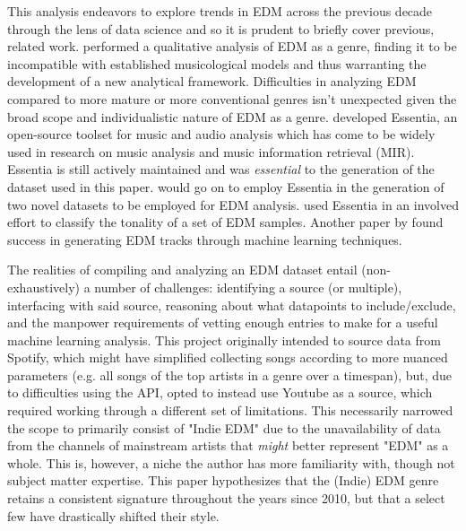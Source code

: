 \documentclass[article,pdftex,12pt,a4paper]{article}
\begin{document}
This analysis endeavors to explore trends in EDM across the previous decade through the lens of data science and so it is prudent to briefly cover previous, related work. \cite{van2016distinctiveness} performed a qualitative analysis of EDM as a genre, finding it to be incompatible with established musicological models and thus warranting the development of a new analytical framework. Difficulties in analyzing EDM compared to more mature or more conventional genres isn't unexpected given the broad scope and individualistic nature of EDM as a genre. \cite{bogdanov2013essentia} developed Essentia, an open-source toolset for music and audio analysis which has come to be widely used in research on music analysis and music information retrieval (MIR). Essentia is still actively maintained and was \textit{essential} to the generation of the dataset used in this paper. \cite{knees2015two} would go on to employ Essentia in the generation of two novel datasets to be employed for EDM analysis. \cite{faraldo2016key} used Essentia in an involved effort to classify the tonality of a set of EDM samples. Another paper by \cite{eigenfeldt2013evolving} found success in generating EDM tracks through machine learning techniques.

The realities of compiling and analyzing an EDM dataset entail (non-exhaustively) a number of challenges: identifying a source (or multiple), interfacing with said source, reasoning about what datapoints to include/exclude, and the manpower requirements of vetting enough entries to make for a useful machine learning analysis. This project originally intended to source data from Spotify, which might have simplified collecting songs according to more nuanced parameters (e.g. all songs of the top artists in a genre over a timespan), but, due to difficulties using the API, opted to instead use Youtube as a source, which required working through a different set of limitations. This necessarily narrowed the scope to primarily consist of "Indie EDM" due to the unavailability of data from the channels of mainstream artists that \textit{might} better represent "EDM" as a whole. This is, however, a niche the author has more familiarity with, though not subject matter expertise. This paper hypothesizes that the (Indie) EDM genre retains a consistent signature throughout the years since 2010, but that a select few have drastically shifted their style.
\end{document}
